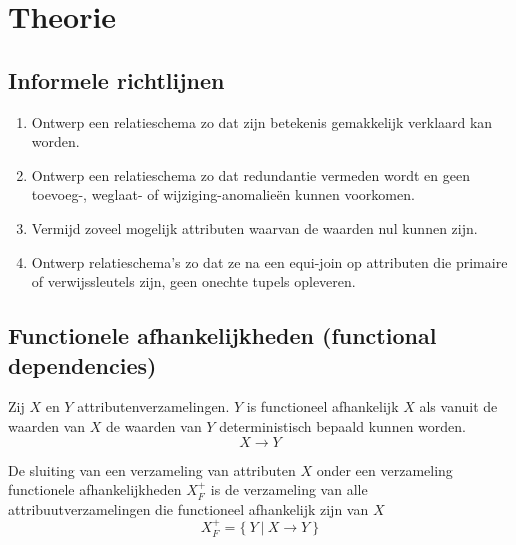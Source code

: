 \documentclass[normaalvormen.tex]{subfiles}
\begin{document}
\chapter{Theorie}
\section{Informele richtlijnen}
\begin{enumerate}
\item Ontwerp een relatieschema zo dat zijn betekenis gemakkelijk verklaard kan worden.

\item Ontwerp een relatieschema zo dat redundantie vermeden wordt en geen toevoeg-, weglaat- of wijziging-anomalie\"en kunnen voorkomen.

\item Vermijd zoveel mogelijk attributen waarvan de waarden nul kunnen zijn.

\item Ontwerp relatieschema's zo dat ze na een equi-join op attributen die primaire of verwijssleutels zijn, geen onechte tupels opleveren.
\end{enumerate}


\section{Functionele afhankelijkheden (functional dependencies)}
\begin{de}
Zij  $X$ en $Y$ attributenverzamelingen. $Y$ is functioneel afhankelijk $X$ als vanuit de waarden van $X$ de waarden van $Y$ deterministisch bepaald kunnen worden.
\[
X\rightarrow Y
\]
\end{de}
\begin{de}
De sluiting van een verzameling van attributen $X$ onder een verzameling functionele afhankelijkheden $X_{F}^+$ is de verzameling van alle attribuutverzamelingen die functioneel afhankelijk zijn van $X$
\[
X_{F}^{+} = \{\ Y\ |\ X\rightarrow Y\ \}
\]
\end{de}
\end{document}
